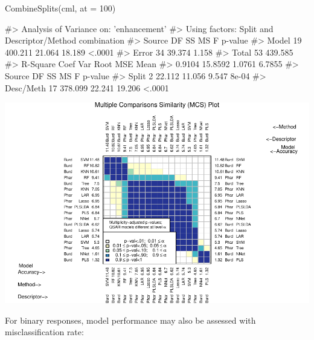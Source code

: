 \begin{Schunk}
\begin{Sinput}
CombineSplits(cml, at = 100)
\end{Sinput}
\begin{Soutput}
#>    Analysis of Variance on: 'enhancement'
#>  Using factors: Split and Descriptor/Method combination
#> Source    DF        SS        MS         F   p-value   
#> Model     19   400.211    21.064    18.189    <.0001   
#> Error     34    39.374     1.158   
#> Total     53   439.585   
#>       R-Square   Coef Var   Root MSE       Mean   
#>         0.9104    15.8592     1.0761     6.7855   
#> Source       DF        SS        MS         F   p-value   
#> Split         2    22.112    11.056     9.547     8e-04   
#> Desc/Meth    17   378.099    22.241    19.206    <.0001
\end{Soutput}

\includegraphics{chemmodlabRJournal_files/figure-latex/CombineSplits_ie_100-1} \end{Schunk}

For binary responses, model performance may also be assessed with
misclassification rate:

